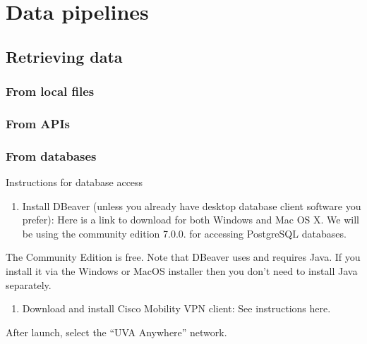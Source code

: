 \documentclass[
]{book}
\providecommand{\tightlist}{%
  \setlength{\itemsep}{0pt}\setlength{\parskip}{0pt}}
\begin{document}
\hypertarget{data-pipelines}{%
\chapter{Data pipelines}\label{data-pipelines}}

\hypertarget{retrieving-data}{%
\section{Retrieving data}\label{retrieving-data}}

\hypertarget{from-local-files}{%
\subsection{From local files}\label{from-local-files}}

\hypertarget{from-apis}{%
\subsection{From APIs}\label{from-apis}}

\hypertarget{from-databases}{%
\subsection{From databases}\label{from-databases}}

Instructions for database access

\begin{enumerate}
\def\labelenumi{(\arabic{enumi})}
\tightlist
\item
  Install DBeaver (unless you already have desktop database client software you prefer): Here is a link to download for both Windows and Mac OS X. We will be using the community edition 7.0.0. for accessing PostgreSQL databases.
\end{enumerate}

The Community Edition is free. Note that DBeaver uses and requires Java. If you install it via the Windows or MacOS installer then you don't need to install Java separately.

\begin{enumerate}
\def\labelenumi{(\arabic{enumi})}
\setcounter{enumi}{1}
\tightlist
\item
  Download and install Cisco Mobility VPN client: See instructions here.
\end{enumerate}

After launch, select the ``UVA Anywhere'' network.
\end{document}
